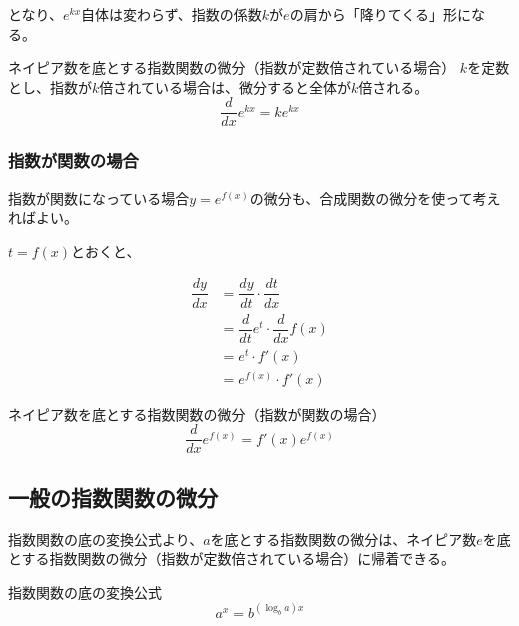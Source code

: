 \documentclass[../../imaging-math]{subfiles}
\begin{document}
となり、$e^{kx}$自体は変わらず、指数の係数$k$が$e$の肩から「降りてくる」形になる。

\begin{theorem}{ネイピア数を底とする指数関数の微分（指数が定数倍されている場合）}
  \titlegap
  $k$を定数とし、指数が$k$倍されている場合は、微分すると全体が$k$倍される。
  \LARGE
  \begin{equation}
    \dfrac{d}{dx}e^{kx} = ke^{kx}
  \end{equation}
\end{theorem}

\subsubsection{指数が関数の場合}

指数が関数になっている場合$y=e^{f(x)}$の微分も、合成関数の微分を使って考えればよい。

$t=f(x)$とおくと、

\begin{align}
  \dfrac{dy}{dx} & = \dfrac{dy}{dt} \cdot \dfrac{dt}{dx}      \\
                 & = \dfrac{d}{dt}e^t \cdot \dfrac{d}{dx}f(x) \\
                 & = e^t \cdot f'(x)                          \\
                 & = e^{f(x)} \cdot f'(x)
\end{align}

\begin{theorem}{ネイピア数を底とする指数関数の微分（指数が関数の場合）}
  \LARGE
  \begin{equation}
    \dfrac{d}{dx}e^{f(x)} = f'(x)e^{f(x)}
  \end{equation}
\end{theorem}

\subsection{一般の指数関数の微分}

指数関数の底の変換公式より、$a$を底とする指数関数の微分は、ネイピア数$e$を底とする指数関数の微分（指数が定数倍されている場合）に帰着できる。

\begin{review}
  指数関数の底の変換公式
  \begin{equation}
    a^x = b^{(\log_b a)x}
  \end{equation}
\end{review}
\end{document}
